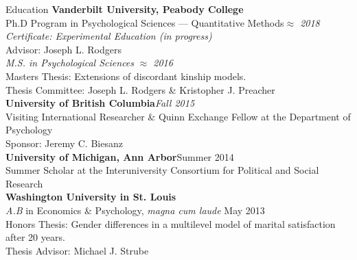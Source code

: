 \documentclass {resume}
\begin{document}
\nonfrenchspacing

\thispagestyle{myheadings}\markright{\em{\textrm \today}}
\pagestyle{myheadings}

\begin{rSection}{\textrm{Education}}
{\bf Vanderbilt University, Peabody College} \\
Ph.D Program in Psychological Sciences --- Quantitative Methods\hfill  {\em $\approx$ 2018} \\
\hspace* {3 mm}\textit{Certificate: Experimental Education (in progress)}\\
\hspace* {3 mm}Advisor: Joseph L. Rodgers%
\smallskip\\
\textit{M.S. in Psychological Sciences} \hfill  {\em $\approx$ 2016} \\
\hspace* {3 mm}Masters Thesis: Extensions of discordant kinship models.\\
\hspace* {3 mm}Thesis Committee: Joseph L. Rodgers \& Kristopher J. Preacher%
\medskip\\
\textbf{University of British Columbia}\hfill \textit{Fall 2015}\\ 
Visiting International Researcher \& Quinn Exchange Fellow at the Department of Psychology\\
\hspace* {3 mm} Sponsor: Jeremy C. Biesanz\medskip\\
\textbf{University of Michigan, Ann Arbor}\hfill Summer 2014\\ 
Summer Scholar at the Interuniversity Consortium for Political and Social Research\medskip\\
{\bf Washington University in St. Louis}\\
{\em A.B} in Economics \& Psychology, \textit{magna cum laude} \hfill  {May 2013} \\
\hspace* {3 mm}Honors Thesis: Gender differences in a multilevel model of marital satisfaction after 20 years.\\
\hspace* {3 mm}Thesis Advisor: Michael J. Strube%
\end{rSection}
\end{document}
